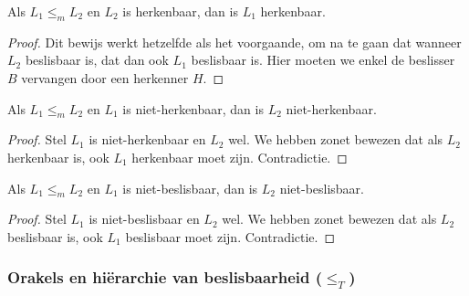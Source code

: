 \begin{theorem}
	Als $L_1 \leq_m L_2$ en $L_2$ is herkenbaar, dan is $L_1$ herkenbaar.
\end{theorem}

\begin{proof}
	Dit bewijs werkt hetzelfde als het voorgaande, om na te gaan dat wanneer $L_2$ beslisbaar is, dat dan ook $L_1$ beslisbaar is. Hier moeten we enkel de beslisser $B$ vervangen door een herkenner $H$.
\end{proof}

\begin{theorem}
	Als $L_1 \leq_m L_2$ en $L_1$ is niet-herkenbaar, dan is $L_2$ niet-herkenbaar.
\end{theorem}

\begin{proof}
	Stel $L_1$ is niet-herkenbaar en $L_2$ wel. We hebben zonet bewezen dat als $L_2$ herkenbaar is, ook $L_1$ herkenbaar moet zijn. Contradictie.
\end{proof}

\begin{theorem}
	Als $L_1 \leq_m L_2$ en $L_1$ is niet-beslisbaar, dan is $L_2$ niet-beslisbaar.
\end{theorem}

\begin{proof}
	Stel $L_1$ is niet-beslisbaar en $L_2$ wel. We hebben zonet bewezen dat als $L_2$ beslisbaar is, ook $L_1$ beslisbaar moet zijn. Contradictie.
\end{proof}

\subsubsection*{Orakels en hi\"erarchie van beslisbaarheid ($\leq_T$)}

